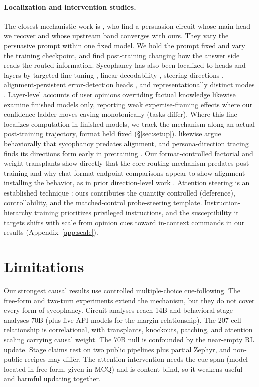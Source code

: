 \documentclass{article}
\begin{document}
\paragraph{Localization and intervention studies.} The closest mechanistic work is \citet{sun2026persuaded}, who find a persuasion circuit whose main head we recover and whose upstream band converges with ours. They vary the persuasive prompt within one fixed model. We hold the prompt fixed and vary the training checkpoint, and find post-training changing how the answer side reads the routed information. Sycophancy has also been localized to heads and layers by targeted fine-tuning \citep{he2024pinpoint}, linear decodability \citep{genadi2026sycophancy}, steering directions \citep{vennemeyer2025distinct}, alignment-persistent error-detection heads \citep{pandey2026sharedcircuit}, and representationally distinct modes \citep{gotta2026modes}. Layer-level accounts of user opinions overriding factual knowledge \citep{wang2026truth} likewise examine finished models only, reporting weak expertise-framing effects where our confidence ladder moves caving monotonically (tasks differ). Where this line localizes computation in finished models, we track the mechanism along an actual post-training trajectory, format held fixed (\S\ref{sec:setup}). \citet{kumarappan2026notjustrlhf} likewise argue behaviorally that sycophancy predates alignment, and persona-direction tracing finds its directions form early in pretraining \citep{moskvoretskii2026persona}. Our format-controlled factorial and weight transplants show directly that the core routing mechanism predates post-training and why chat-format endpoint comparisons appear to show alignment installing the behavior, as in prior direction-level work \citep{gupta2026directions}. Attention steering is an established technique \citep{zhang2023pasta}: ours contributes the quantity controlled (deference), controllability, and the matched-control probe-steering template. Instruction-hierarchy training \citep{wallace2024hierarchy} prioritizes privileged instructions, and the susceptibility it targets shifts with scale from opinion cues toward in-context commands in our results (Appendix~\ref{app:scale}).

\section{Limitations}
\label{sec:limits}
Our strongest causal results use controlled multiple-choice cue-following. The free-form and two-turn experiments extend the mechanism, but they do not cover every form of sycophancy. Circuit analyses reach 14B and behavioral stage analyses 70B (plus five API models for the margin relationship). The 207-cell relationship is correlational, with transplants, knockouts, patching, and attention scaling carrying causal weight. The 70B null is confounded by the near-empty RL update. Stage claims rest on two public pipelines plus partial Zephyr, and non-public recipes may differ. The attention intervention needs the cue span (model-located in free-form, given in MCQ) and is content-blind, so it weakens useful and harmful updating together.
\end{document}
